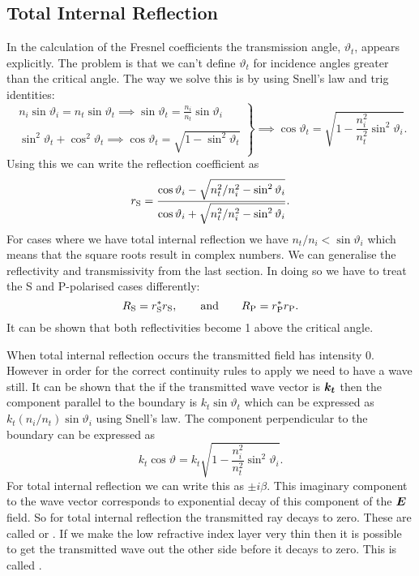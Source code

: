    \subsection{Total Internal Reflection}
    In the calculation of the Fresnel coefficients the transmission angle, \(\vartheta_t\), appears explicitly.
    The problem is that we can't define \(\vartheta_t\) for incidence angles greater than the critical angle.
    The way we solve this is by using Snell's law and trig identities:
    \[
        \left.
        \begin{array}{r}
        n_i\sin\vartheta_i = n_t\sin\vartheta_t \implies \sin\vartheta_t =  \frac{n_i}{n_t}\sin\vartheta_i\\
        \\
        \sin^2\vartheta_t + \cos^2\vartheta_t \implies \cos\vartheta_t = \sqrt{1 - \sin^2\vartheta_t}
        \end{array}
        \right\} \implies
        \cos\vartheta_t = \sqrt{1 - \frac{n_i^2}{n_t^2} \sin^2\vartheta_i}.
    \]
    Using this we can write the reflection coefficient as
    \[{r}_{\mathrm{{S}}} = \frac{\cos\vartheta_i - \sqrt{n_t^2/n_i^2 - \sin^2\vartheta_i}}{\cos\vartheta_i + \sqrt{n_t^2/n_i^2 - \sin^2\vartheta_i}}.\]
    For cases where we have total internal reflection we have \(n_t/n_i < \sin\vartheta_i\) which means that the square roots result in complex numbers.
    We can generalise the reflectivity and transmissivity from the last section.
    In doing so we have to treat the S and P-polarised cases differently:
    \[{R}_{\mathrm{{S}}} = {r}_{\mathrm{{S}}}^*{r}_{\mathrm{{S}}}, \qquad\text{and}\qquad {R}_{\mathrm{{P}}} = {r}_{\mathrm{{P}}}^*{r}_{\mathrm{{P}}}.\]
    It can be shown that both reflectivities become 1 above the critical angle.
    
    When total internal reflection occurs the transmitted field has intensity 0.
    However in order for the correct continuity rules to apply we need to have a wave still.
    It can be shown that the if the transmitted wave vector is \(\bm{k_t}\) then the component parallel to the boundary is \(k_t\sin\vartheta_t\) which can be expressed as \(k_t(n_i/n_t)\sin\vartheta_i\) using Snell's law.
    The component perpendicular to the boundary can be expressed as
    \[k_t\cos\vartheta = k_t\sqrt{1 - \frac{n_i^2}{n_t^2}\sin^2\vartheta_i}.\]
    For total internal reflection we can write this as \(\pm i\beta\).
    This imaginary component to the wave vector corresponds to exponential decay of this component of the \(\bm{E}\) field.
    So for total internal reflection the transmitted ray decays to zero.
    These are called  or .
    If we make the low refractive index layer very thin then it is possible to get the transmitted wave out the other side before it decays to zero.
    This is called .
    
